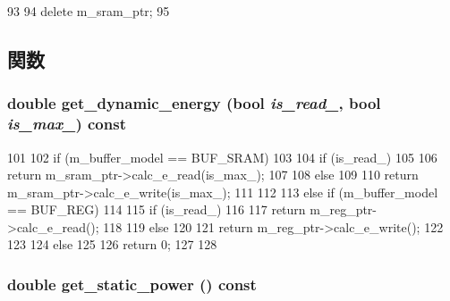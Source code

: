 \begin{DoxyCode}
93 {
94     delete m_sram_ptr;
95 }
\end{DoxyCode}


\subsection{関数}
\hypertarget{classBuffer_a10fb66546e1cf164fe736f85adc39a63}{
\subsubsection[{get\_\-dynamic\_\-energy}]{\setlength{\rightskip}{0pt plus 5cm}double get\_\-dynamic\_\-energy (bool {\em is\_\-read\_\-}, \/  bool {\em is\_\-max\_\-}) const}}
\label{classBuffer_a10fb66546e1cf164fe736f85adc39a63}



\begin{DoxyCode}
101 {
102     if (m_buffer_model == BUF_SRAM)
103     {
104         if (is_read_)
105         {
106             return m_sram_ptr->calc_e_read(is_max_);
107         }
108         else
109         {
110             return m_sram_ptr->calc_e_write(is_max_);
111         }
112     }
113     else if (m_buffer_model == BUF_REG)
114     {
115         if (is_read_)
116         {
117             return m_reg_ptr->calc_e_read();
118         }
119         else
120         {
121             return m_reg_ptr->calc_e_write();
122         }
123     }
124     else
125     {
126         return 0;
127     }
128 }
\end{DoxyCode}
\hypertarget{classBuffer_aeb5933543cfdeb1668baed5ce7c68351}{
\subsubsection[{get\_\-static\_\-power}]{\setlength{\rightskip}{0pt plus 5cm}double get\_\-static\_\-power () const}}
\label{classBuffer_aeb5933543cfdeb1668baed5ce7c68351}



